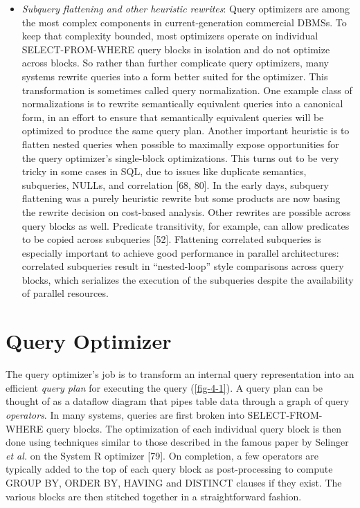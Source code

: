 \documentclass[a4paper,11pt,twoside,openright]{book}
\begin{document}
\begin{itemize}
\item
  \emph{Subquery flattening and other heuristic rewrites}: Query
  optimizers are among the most complex components in current-generation
  commercial DBMSs. To keep that complexity bounded, most optimizers
  operate on individual SELECT-FROM-WHERE query blocks in isolation and
  do not optimize across blocks. So rather than further complicate query
  optimizers, many systems rewrite queries into a form better suited for
  the optimizer. This transformation is sometimes called query
  normalization. One example class of normalizations is to rewrite
  semantically equivalent queries into a canonical form, in an effort to
  ensure that semantically equivalent queries will be optimized to
  produce the same query plan. Another important heuristic is to flatten
  nested queries when possible to maximally expose opportunities for the
  query optimizer's single-block optimizations. This turns out to be
  very tricky in some cases in SQL, due to issues like duplicate
  semantics, subqueries, NULLs, and correlation {[}68, 80{]}. In the
  early days, subquery flattening was a purely heuristic rewrite but
  some products are now basing the rewrite decision on cost-based
  analysis. Other rewrites are possible across query blocks as well.
  Predicate transitivity, for example, can allow predicates to be copied
  across subqueries {[}52{]}. Flattening correlated subqueries is
  especially important to achieve good performance in parallel
  architectures: correlated subqueries result in ``nested-loop'' style
  comparisons across query blocks, which serializes the execution of the
  subqueries despite the availability of parallel resources.
\end{itemize}

\hypertarget{query-optimizer}{%
\section{Query Optimizer}\label{query-optimizer}}

The query optimizer's job is to transform an internal query
representation into an efficient \emph{query plan} for executing the
query (\autoref{fig-4-1}). A query plan can be thought of as a dataflow diagram
that pipes table data through a graph of query \emph{operators}. In many
systems, queries are first broken into SELECT-FROM-WHERE query blocks.
The optimization of each individual query block is then done using
techniques similar to those described in the famous paper by Selinger
\emph{et al.} on the System R optimizer {[}79{]}. On completion, a few
operators are typically added to the top of each query block as
post-processing to compute GROUP BY, ORDER BY, HAVING and DISTINCT
clauses if they exist. The various blocks are then stitched together in
a straightforward fashion.
\end{document}
